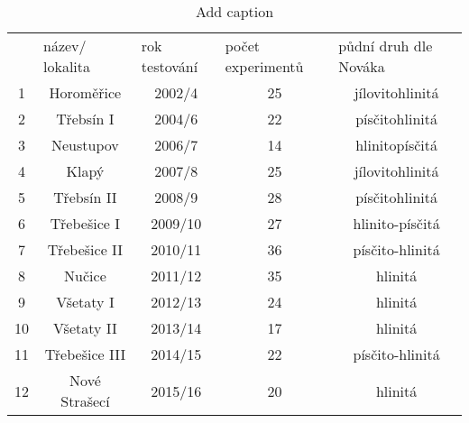 \begin{table}[htbp]
  \centering
  \caption{Add caption}
    \begin{tabular}{ccccc}
          & \multicolumn{1}{l}{název/ lokalita} & \multicolumn{1}{l}{rok testování} & \multicolumn{1}{l}{počet experimentů} & \multicolumn{1}{l}{půdní druh dle Nováka} \\
    1     & Horoměřice & 2002/4 & 25    & jílovitohlinitá \\
    2     & Třebsín I & 2004/6 & 22    & písčitohlinitá \\
    3     & Neustupov & 2006/7 & 14    & hlinitopísčitá \\
    4     & Klapý & 2007/8 & 25    & jílovitohlinitá \\
    5     & Třebsín II & 2008/9 & 28    & písčitohlinitá \\
    6     & Třebešice I & 2009/10 & 27    & hlinito-písčitá \\
    7     & Třebešice II & 2010/11 & 36    & písčito-hlinitá \\
    8     & Nučice & 2011/12 & 35    & hlinitá \\
    9     & Všetaty I & 2012/13 & 24    & hlinitá \\
    10    & Všetaty II & 2013/14 & 17    & hlinitá \\
    11    & Třebešice III & 2014/15 & 22    & písčito-hlinitá \\
    12    & Nové Strašecí & 2015/16 & 20    & hlinitá \\
    \end{tabular}%
  \label{tab:addlabel}%
\end{table}%